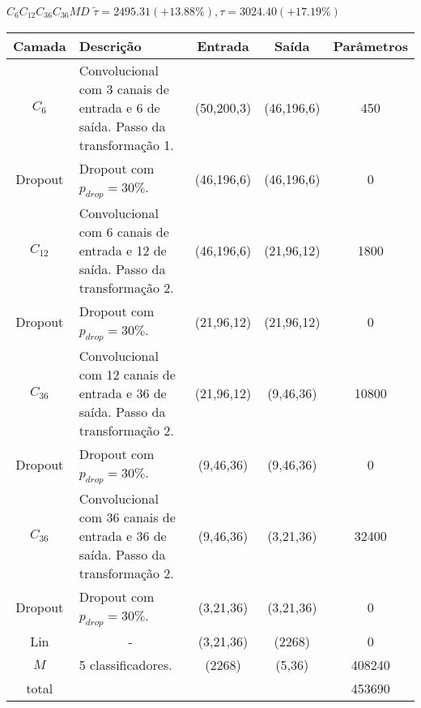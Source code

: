 \begin{tiny}
\begin{table}[H]
	$C_6C_{12}C_{36}C_{36}MD$ $\tilde{\tau}=2495.31 (+13.88\%), \tau=3024.40 (+17.19\%)$\newline
	\begin{tabularx}{\linewidth}{ |c|X|c|c|c| }
		\hline
		Camada & Descrição & Entrada & Saída & Parâmetros \\ \hline
		$C_{6}$ & Convolucional com 3 canais de entrada e 6 de saída. Passo da transformação 1. & (50,200,3) & (46,196,6) & 450 \\ \hline
		Dropout & Dropout com $p_{drop} = 30\%$. & (46,196,6) & (46,196,6) & 0 \\ \hline
		$C_{12}$ & Convolucional com 6 canais de entrada e 12 de saída. Passo da transformação 2. & (46,196,6) & (21,96,12) & 1800 \\ \hline
		Dropout & Dropout com $p_{drop} = 30\%$. & (21,96,12) & (21,96,12) & 0 \\ \hline
		$C_{36}$ & Convolucional com 12 canais de entrada e 36 de saída. Passo da transformação 2. & (21,96,12) & (9,46,36) & 10800 \\ \hline
		Dropout & Dropout com $p_{drop} = 30\%$. & (9,46,36) & (9,46,36) & 0 \\ \hline
		$C_{36}$ & Convolucional com 36 canais de entrada e 36 de saída. Passo da transformação 2. & (9,46,36) & (3,21,36) & 32400 \\ \hline
		Dropout & Dropout com $p_{drop} = 30\%$. & (3,21,36) & (3,21,36) & 0 \\ \hline
		Lin & \multicolumn{1}{c|}{-} & (3,21,36) & (2268) & 0 \\ \hline
		$M$ & 5 classificadores. & (2268) & (5,36) & 408240 \\ \hline
		total &  &  &  & 453690 \\ \hline
	\end{tabularx}
\end{table}


\end{tiny}
